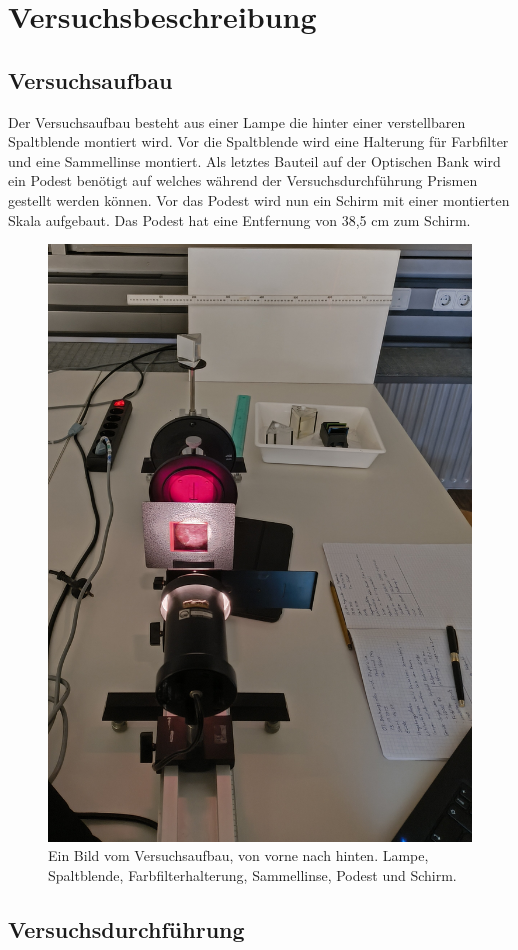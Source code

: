 \section{Versuchsbeschreibung}
\subsection{Versuchsaufbau}
Der Versuchsaufbau besteht aus einer Lampe die hinter einer verstellbaren 
Spaltblende montiert wird. Vor die Spaltblende wird eine Halterung für 
Farbfilter und eine Sammellinse montiert. Als letztes Bauteil auf der 
Optischen Bank wird ein Podest benötigt auf welches während der 
Versuchsdurchführung Prismen gestellt werden können. Vor das Podest wird 
nun ein Schirm mit einer montierten Skala aufgebaut. Das Podest hat eine 
Entfernung von 38,5 cm zum Schirm.
\begin{figure}[!htb]
\centering
\includegraphics[scale=0.08]{Bilder/Richtiger Aufbau.jpg}
\caption{Ein Bild vom Versuchsaufbau, von vorne nach hinten. Lampe, Spaltblende, Farbfilterhalterung, Sammellinse, Podest und Schirm.  }
\end{figure}



\subsection{Versuchsdurchführung}

